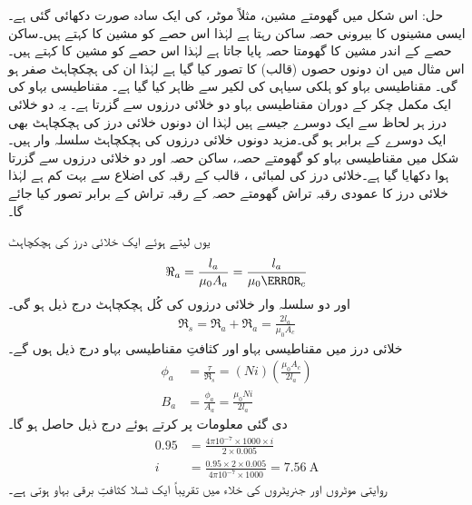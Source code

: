 حل:\quad
اس شکل میں گھومتے مشین، مثلاً موٹر، کی ایک سادہ صورت دکھائی گئی ہے۔ ایسی مشینوں کا بیرونی حصہ ساکن رہتا ہے لہٰذا اس حصے  کو مشین کا  کہتے ہیں۔ساکن حصے کے اندر مشین کا  گھومتا حصہ پایا جاتا ہے لہٰذا اس حصے کو مشین کا  کہتے ہیں۔ اس مثال میں ان دونوں  حصوں (قالب) کا    تصور کیا گیا ہے لہٰذا ان کی ہچکچاہٹ صفر ہو گی۔ مقناطیسی بہاو  کو ہلکی سیاہی کی لکیر سے ظاہر کیا گیا ہے۔ مقناطیسی بہاو کی ایک مکمل چکر کے دوران مقناطیسی بہاو دو خلائی درزوں  سے گزرتا ہے۔ یہ دو خلائی درز ہر لحاظ سے ایک دوسرے  جیسے ہیں لہٰذا ان دونوں خلائی درز کی ہچکچاہٹ بھی ایک دوسرے کے برابر ہو گی۔مزید دونوں خلائی درزوں کی ہچکچاہٹ سلسلہ وار ہیں۔شکل  میں مقناطیسی بہاو کو گھومتے حصہ، ساکن حصہ اور دو خلائی درزوں  سے گزرتا ہوا دکھایا گیا ہے۔خلائی درز کی لمبائی ، قالب کے رقبہ  کی اضلاع سے بہت کم ہے لہٰذا خلائی درز کا عمودی رقبہ تراش   گھومتے حصہ کے رقبہ تراش  کے برابر تصور کیا جائے گا۔

یوں  لیتے ہوئے ایک خلائی درز کی ہچکچاہٹ
\begin{align*}
\Re_a=\frac{l_a}{\mu_0 A_a}=\frac{l_a}{\mu_0 \A_c}
\end{align*}
اور دو سلسلہ وار خلائی درزوں کی کُل ہچکچاہٹ درج ذیل ہو گی۔
\begin{align*}
\Re_s=\Re_a+\Re_a=\frac{2 l_a}{\mu_0 A_c}
\end{align*}
خلائی درز میں مقناطیسی بہاو  اور کثافتِ مقناطیسی بہاو  درج ذیل ہوں گے۔
\begin{align*}
\phi_a&=\frac{\tau}{\Re_s}=\left(N i \right) \left (\frac{\mu_0 A_c}{2 l_a} \right)\\
B_a&=\frac{\phi_a}{A_a}=\frac{\mu_0 N i}{2 l_a}
\end{align*}
دی گئی معلومات پر کرتے ہوئے درج ذیل حاصل ہو گا۔
\begin{align*}
0.95&=\frac{4 \pi 10^{-7} \times 1000 \times i}{2 \times 0.005}\\
i&=\frac{0.95 \times 2 \times 0.005}{ 4 \pi 10^{-7} \times 1000}=\SI{7.56}{\ampere}
\end{align*}
روایتی موٹروں اور جنریٹروں کی خلاء میں تقریباً ایک ٹسلا کثافتِ برقی بہاو ہوتی ہے۔

